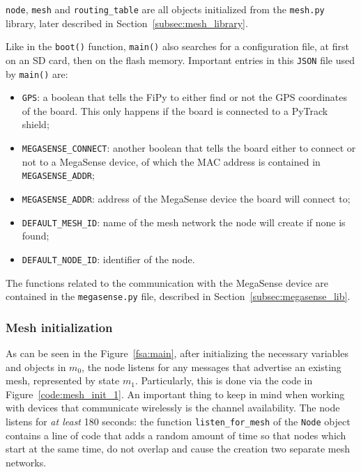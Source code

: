 				\texttt{node}, \texttt{mesh} and \texttt{routing\_table} are all objects initialized from the \texttt{mesh.py} library, later described in Section~\ref{subsec:mesh_library}.
				
				Like in the \texttt{boot()} function, \texttt{main()} also searches for a configuration file, at first on an SD card, then on the flash memory.
				Important entries in this \texttt{JSON} file used by \texttt{main()} are:
				\begin{itemize}
					\item \texttt{GPS}: a boolean that tells the FiPy to either find or not the GPS coordinates of the board. This only happens if the board is connected to a PyTrack shield;
					\item \texttt{MEGASENSE\_CONNECT}: another boolean that tells the board either to connect or not to a MegaSense device, of which the MAC address is contained in \texttt{MEGASENSE\_ADDR};
					\item \texttt{MEGASENSE\_ADDR}: address of the MegaSense device the board will connect to;
		    		\item \texttt{DEFAULT\_MESH\_ID}: name of the mesh network the node will create if none is found;
					\item \texttt{DEFAULT\_NODE\_ID}: identifier of the node.
				\end{itemize}
			
				The functions related to the communication with the MegaSense device are contained in the \texttt{megasense.py} file, described in Section~\ref{subsec:megasense_lib}.
				
			\subsubsection{Mesh initialization}\label{subsec:initialization}
			
				As can be seen in the Figure~\ref{fsa:main}, after initializing the necessary variables and objects in $ m_0 $, the node listens for any messages that advertise an existing mesh, represented by state $ m_1 $.
				Particularly, this is done via the code in Figure~\ref{code:mesh_init_1}.
				An important thing to keep in mind when working with devices that communicate wirelessly is the channel availability.
				The node listens for \textit{at least} 180 seconds: the function \texttt{listen\_for\_mesh} of the \texttt{Node} object contains a line of code that adds a random amount of time so that nodes which start at the same time, do not overlap and cause the creation two separate mesh networks.
				
